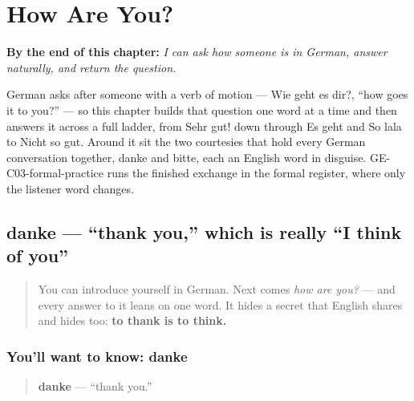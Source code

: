 
\chapter{How Are You?}
\label{ch:how-are-you}

\begin{chapteropening}
\textbf{By the end of this chapter:} \emph{I can ask how someone is in German, answer naturally, and return the question.}

German asks after someone with a verb of motion — Wie geht es dir?, \textquotedblleft{}how goes it to you?\textquotedblright{} — so this chapter builds that question one word at a time and then answers it across a full ladder, from Sehr gut! down through Es geht and So lala to Nicht so gut. Around it sit the two courtesies that hold every German conversation together, danke and bitte, each an English word in disguise. GE-C03-formal-practice runs the finished exchange in the formal register, where only the listener word changes.
\end{chapteropening}

\section[danke]{danke — \textquotedblleft{}thank you,\textquotedblright{} which is really \textquotedblleft{}I think of you\textquotedblright{}}

\label{lesson:GE-C03-danke}



\begin{quote}
You can introduce yourself in German. Next comes \emph{how are you?} — and every answer to it leans on one word. It hides a secret that English shares and hides too: \textbf{to thank is to think.}
\end{quote}

\subsection*{You'll want to know: danke}
\begin{quote}
\textbf{danke} — \textquotedblleft{}thank you.\textquotedblright{}
\end{quote}


